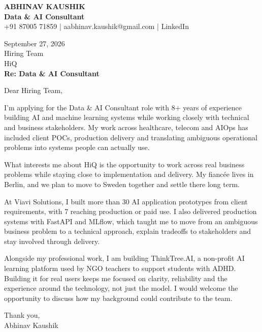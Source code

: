 \documentclass[10pt,a4paper]{article}
\begin{document}
\begin{center}
{\Large\bfseries ABHINAV KAUSHIK}\\[2pt]
{\bfseries Data \& AI Consultant}\\[2pt]
+91 87005 71859 \quad | \quad aabhinav.kaushik@gmail.com \quad | \quad LinkedIn
\end{center}
\vspace{8pt}
September 27, 2026\\[6pt]
Hiring Team\\
HiQ\\[4pt]
\textbf{Re: Data \& AI Consultant}

Dear Hiring Team,

I’m applying for the Data \& AI Consultant role with 8+ years of experience building AI and machine learning systems while working closely with technical and business stakeholders. My work across healthcare, telecom and AIOps has included client POCs, production delivery and translating ambiguous operational problems into systems people can actually use.

What interests me about HiQ is the opportunity to work across real business problems while staying close to implementation and delivery. My fiancée lives in Berlin, and we plan to move to Sweden together and settle there long term.

At Viavi Solutions, I built more than 30 AI application prototypes from client requirements, with 7 reaching production or paid use. I also delivered production systems with FastAPI and MLflow, which taught me to move from an ambiguous business problem to a technical approach, explain tradeoffs to stakeholders and stay involved through delivery.

Alongside my professional work, I am building ThinkTree.AI, a non-profit AI learning platform used by NGO teachers to support students with ADHD. Building it for real users keeps me focused on clarity, reliability and the experience around the technology, not just the model. I would welcome the opportunity to discuss how my background could contribute to the team.

Thank you,\\
Abhinav Kaushik
\end{document}
